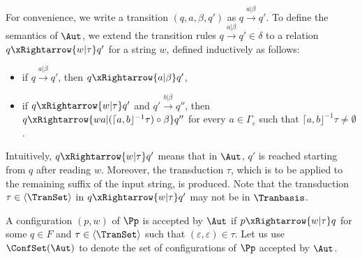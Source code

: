 For convenience, we write a transition $(q, a, \beta, q')$ as $q \xrightarrow{a | \beta} q'$. 
To define the semantics of $\Aut$, we extend the transition rules $q \xrightarrow{a | \beta} q' \in \delta$  to a relation $q \xRightarrow{w | \tau} q'$ for a string $w$,  
%
defined inductively as follows:
\begin{itemize}
	\item if $q \xrightarrow{a |\beta} q'$, then $q \xRightarrow{a | \beta} q'$, 
	\item if $q \xRightarrow{w | \tau} q'$ and $q' \xrightarrow{b |\beta } q'' $, then $q \xRightarrow{w a | (\lceil a, b\rfloor^{-1}\tau) \circ \beta} q''$ for every $a \in \Gamma_\varepsilon$ such that $\lceil a, b\rfloor^{-1}\tau \neq \emptyset$.
\end{itemize}
Intuitively, $q \xRightarrow{w | \tau} q'$ means that in $\Aut$,  $q'$ is reached starting from $q$ after reading $w$. Moreover, the transduction $\tau$, which is  to be applied to the remaining suffix of the input string, is produced. Note that the transduction  $\tau \in \langle \TranSet \rangle$ in $q \xRightarrow{w | \tau} q'$ may not be in $\Tranbasis$. 

A configuration $(p, w)$ of $\Pp$ is accepted by $\Aut$ if $p \xRightarrow{w | \tau} q$ for some $q \in F$ and $\tau \in \langle \TranSet \rangle$ such that $(\varepsilon, \varepsilon) \in \tau$.
%
Let us use $\ConfSet(\Aut)$ to denote the set of configurations of $\Pp$ accepted by $\Aut$.

